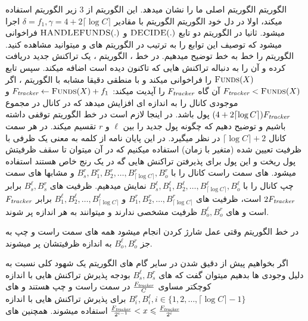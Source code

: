 الگوریتم  الگوریتم اصلی ما را نشان میدهد. این الگوریتم از 3 زیر الگوریتم استفاده میکند، اولا در دل خود الگوریتم   الگوریتم 
با مقادیر 
$\delta = f_1 , \gamma = 4+2\lceil \log{C}\rceil$
اجرا میشود. ثانیا در الگوریتم    دو تابع 
$\Call{DECIDE}{.}$ 
و
$\Call{HANDLEFUNDS}{.}$ 
فراخوانی میشود که توصیف این توابع را به ترتیب در الگوریتم های
  و  میتوانید مشاهده کنید.
الگوریتم  را خط به خط توضیح میدهیم. در خط ، الگوریتم \on، یک تراکنش جدید دریافت کرده و آن را به دنباله تراکنش هایی که تاکنون دیده است اضافه میکند. سپس تابع 
$\Call{Funds}{X}$
را فراخوانی میکند و با منطقی دقیقا مشابه با الگوریتم ، اگر 
$\tracker < \Call{Funds}{X}$
آن گاه
$F_{\textit{tracker}}$
را آپدیت میکند:
$\tracker \leftarrow  \Call{Funds}{X} + f_1$
 و موجودی کانال را به اندازه ای افزایش میدهد که در کانال در مجموع
$(4+2\lceil \log{C}\rceil)F_{\textit{tracker}}$
پول باشد. در اینجا لازم است در خط  الگوریتم توقفی داشته باشیم و توضیح دهیم که \on چگونه پول جدید را بین $\ell$ و $r$ تقسیم میکند. \on در هر سمت کانال 
$\lceil \log{C}\rceil + 2$
\bucket
در نظر میگیرد. در این پایان نامه از کلمه \bucket به معنی یک ظرفی با ظرفیت تعیین شده (متغیر با زمان) استفاده میکنیم که در آن میتوان تا سقف ظرفیتش پول ریخت و این پول برای پذیرفتن تراکنش هایی گه در یک رنج خاص هستند استفاده میشود. \bucket های سمت راست کانال را با 
$B^{r}_{s}, B^{r}_{1},B^{r}_{2},\dots,B^{r}_{\lceil\log{C}\rceil},B^{r}_{o}$
و مشابها \bucket های سمت چپ کانال را با 
$B^{\ell}_{s}, B^{\ell}_{1},B^{\ell}_{2},\dots,B^{\ell}_{\lceil\log{C}\rceil},B^{\ell}_{o}$
نمایش میدهیم. ظرفیت \bucket های 
$B^{\ell}_{s},B^{r}_{s}$
برابر 
$2F_{\textit{tracker}}$
است، ظرفیت \bucket های 
$B^{r}_{1},B^{r}_{2},\dots,B^{r}_{\lceil\log{C}\rceil}$ و $B^{\ell}_{1},B^{\ell}_{2},\dots,B^{\ell}_{\lceil\log{C}\rceil}$
برابر 
$F_{\textit{tracker}}$
است و \bucket های 
$B^{\ell}_{o},B^{r}_{o}$
ظرفیت مشخصی ندارند و میتوانند به هر اندازه پر شوند.

در خط  الگوریتم   وقتی عمل شارژ کردن انجام میشود همه \bucket های سمت راست و چپ به جز 
$B^{\ell}_{o},B^{r}_{o}$
به اندازه ظرفیتشان پر میشوند.
 
اگر بخواهیم پیش از دقیق شدن در سایر گام های الگوریتم یک شهود کلی نسبت به دلیل وجودی \bucket ها بدهیم میتوان گفت که \bucket های 
$B^{\ell}_{s},B^{r}_{s}$
بودجه پذیرش تراکنش هایی با اندازه کوچکتر مساوی 
$\frac{F_{\textit{tracker}}}{C}$
در سمت راست و چپ هستند و  \bucket های 
$B^{r}_{i},B^{\ell}_{i} , i \in \{1,2,\dots,\lceil\log{C}\rceil-1\}$
برای پذیرش تراکنش هایی با اندازه
$\frac{F_{\textit{tracker}}}{2^{i-1}}<x\leqslant \frac{F_{\textit{tracker}}}{2^{i}}$
استفاده میشوند. همچنین \bucket های

